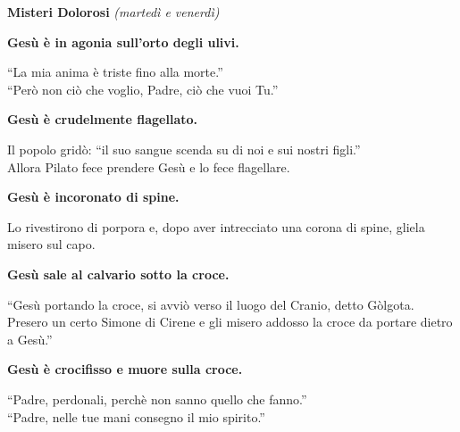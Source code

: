 \textbf{\large{Misteri Dolorosi}} \emph{(martedì e venerdì)}
\setcounter{numstrofa}{0}

\medskip

\textbf{\strofa Gesù è in agonia sull'orto degli ulivi.}

``La mia anima è triste fino alla morte.''\\
``Però non ciò che voglio, Padre, ciò che vuoi Tu.''

\medskip

\textbf{\strofa Gesù è crudelmente flagellato.}

Il popolo gridò: ``il suo sangue scenda su di noi e sui nostri figli.''\\
Allora Pilato fece prendere Gesù e lo fece flagellare.

\medskip

\textbf{\strofa Gesù è incoronato di spine.}

Lo rivestirono di porpora e, dopo aver intrecciato una corona di spine, gliela misero sul capo.

\medskip

\textbf{\strofa Gesù sale al calvario sotto la croce.}

``Gesù portando la croce, si avviò verso il luogo del Cranio, detto Gòlgota.\\
Presero un certo Simone di Cirene e gli misero addosso la croce da portare dietro a Gesù.''

\medskip

\textbf{\strofa Gesù è crocifisso e muore sulla croce.}

``Padre, perdonali, perchè non sanno quello che fanno.''\\
``Padre, nelle tue mani consegno il mio spirito.''
